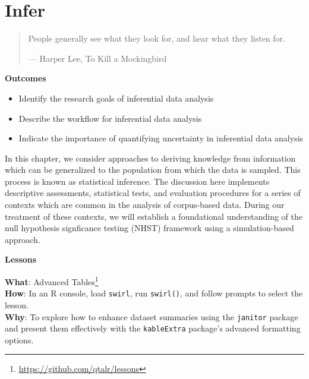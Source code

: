 \documentclass[
  letterpaper,
]{latex/krantz}
\providecommand{\tightlist}{%
  \setlength{\itemsep}{0pt}\setlength{\parskip}{0pt}}\usepackage{longtable,booktabs,array}
\theoremstyle{definition}
\theoremstyle{remark}
\DeclareRobustCommand{\href}[2]{#2\footnote{\url{#1}}}
\begin{document}
\chapter{Infer}\label{sec-infer-chapter}

\begin{quote}
People generally see what they look for, and hear what they listen for.

--- Harper Lee, To Kill a Mockingbird
\end{quote}

\begin{tcolorbox}[enhanced jigsaw, colback=white, colframe=quarto-callout-color-frame, leftrule=.75mm, opacityback=0, rightrule=.15mm, bottomrule=.15mm, toprule=.15mm, breakable, left=2mm, arc=.35mm]

\textbf{ Outcomes}

\begin{itemize}
\tightlist
\item
  Identify the research goals of inferential data analysis
\item
  Describe the workflow for inferential data analysis
\item
  Indicate the importance of quantifying uncertainty in inferential data
  analysis
\end{itemize}

\end{tcolorbox}

In this chapter, we consider approaches to deriving knowledge from
information which can be generalized to the population from which the
data is sampled. This process is known as statistical inference. The
discussion here implements descriptive assessments, statistical tests,
and evaluation procedures for a series of contexts which are common in
the analysis of corpus-based data. During our treatment of these
contexts, we will establish a foundational understanding of the null
hypothesis signficance testing (NHST) framework using a simulation-based
approach.

\begin{tcolorbox}[enhanced jigsaw, colback=white, colframe=quarto-callout-color-frame, leftrule=.75mm, opacityback=0, rightrule=.15mm, bottomrule=.15mm, toprule=.15mm, breakable, left=2mm, arc=.35mm]

\textbf{ Lessons}

\textbf{What}: \href{https://github.com/qtalr/lessons}{Advanced
Tables}\\
\textbf{How}: In an R console, load \texttt{swirl}, run
\texttt{swirl()}, and follow prompts to select the lesson.\\
\textbf{Why}: To explore how to enhance dataset summaries using the
\texttt{janitor} package and present them effectively with the
\texttt{kableExtra} package's advanced formatting options.

\end{tcolorbox}
\end{document}
